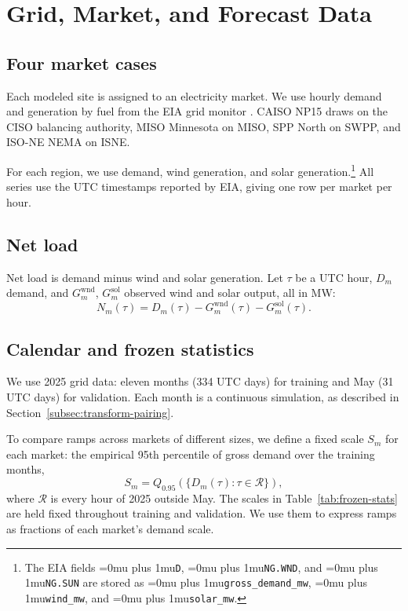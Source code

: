 \documentclass[conference]{IEEEtran}
\newcommand{\codepath}[1]{{\Urlmuskip=0mu plus 1mu\relax\nolinkurl{#1}}}
\begin{document}
\section{Grid, Market, and Forecast Data}
\label{sec:energy-data}

\subsection{Four market cases}
\label{subsec:energy-sources}

Each modeled site is assigned to an electricity market. We use hourly
demand and generation by fuel from the EIA grid monitor
\cite{eiaGridMonitor}. CAISO NP15 draws on the CISO balancing authority,
MISO Minnesota on MISO, SPP North on SWPP, and ISO-NE NEMA on ISNE.

For each region, we use demand, wind generation, and solar
generation.\footnote{The EIA fields \codepath{D},
\codepath{NG.WND}, and \codepath{NG.SUN} are stored as
\codepath{gross_demand_mw}, \codepath{wind_mw}, and \codepath{solar_mw}.} All series use the UTC timestamps reported by EIA, giving one row per market per hour.

\subsection{Net load}
\label{subsec:energy-net-load}

Net load is demand minus wind and solar generation. Let \(\tau\) be a UTC
hour, \(D_m\) demand, and \(G^{\mathrm{wnd}}_m\), \(G^{\mathrm{sol}}_m\)
observed wind and solar output, all in MW:
\begin{equation}
  N_m(\tau)
  =
  D_m(\tau)
  -G^{\mathrm{wnd}}_m(\tau)
  -G^{\mathrm{sol}}_m(\tau).
  \label{eq:energy-net-load}
\end{equation}




\subsection{Calendar and frozen statistics}
\label{subsec:energy-calendar}

We use 2025 grid data: eleven months (334 UTC days) for training and May
(31 UTC days) for validation. Each month is a continuous simulation, as
described in Section~\ref{subsec:transform-pairing}.

To compare ramps across markets of different sizes, we define a fixed scale
\(S_m\) for each market: the empirical 95th percentile of gross demand over
the training months,
\begin{equation}
  S_m
  =
  Q_{0.95}\!\left(\{D_m(\tau):\tau\in\mathcal{R}\}\right),
  \label{eq:market-scale}
\end{equation}
where \(\mathcal{R}\) is every hour of 2025 outside May.
The scales in Table~\ref{tab:frozen-stats} are held fixed throughout training
and validation. We use them to express ramps as fractions of each market's
demand scale.
\end{document}
